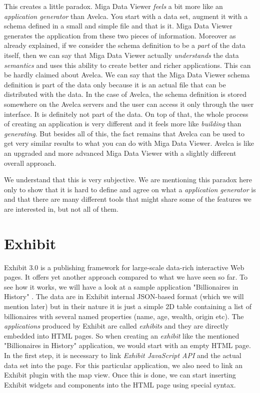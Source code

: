 This creates a little paradox. Miga Data Viewer \emph{feels} a bit more like an \emph{application generator} than Avelca. You start with a data set, augment it with a schema defined in a small and simple file and that is it. Miga Data Viewer generates the application from these two pieces of information. Moreover as already explained, if we consider the schema definition to be a \emph{part} of the data itself, then we can say that Miga Data Viewer actually \emph{understands} the data \emph{semantics} and uses this ability to create better and richer applications. This can be hardly claimed about Avelca. We can say that the Miga Data Viewer schema definition is part of the data only because it is an actual file that can be distributed with the data. In the case of Avelca, the schema definition is stored somewhere on the Avelca servers and the user can access it only through the user interface. It is definitely not part of the data. On top of that, the whole process of creating an application is very different and it feels more like \emph{building} than \emph{generating}. But besides all of this, the fact remains that Avelca can be used to get very similar results to what you can do with Miga Data Viewer. Avelca is like an upgraded and more advanced Miga Data Viewer with a slightly different overall approach.

We understand that this is very subjective. We are mentioning this paradox here only to show that it is hard to define and agree on what a \emph{application generator} is and that there are many different tools that might share some of the features we are interested in, but not all of them.

\section{Exhibit}

Exhibit 3.0 \cite{exhibit} is a publishing framework for large-scale data-rich interactive Web pages. It offers yet another approach compared to what we have seen so far. To see how it works, we will have a look at a sample application "Billionaires in History" \cite{exhibit_example}. The data are in Exhibit internal JSON-based format (which we will mention later) but in their nature it is just a simple 2D table containing a list of billionaires with several named properties (name, age, wealth, origin etc). The \emph{applications} produced by Exhibit are called \emph{exhibits} and they are directly embedded into HTML pages. So when creating an \emph{exhibit} like the mentioned "Billionaires in History" application, we would start with an empty HTML page. In the first step, it is necessary to link \emph{Exhibit JavaScript API} and the actual data set into the page. For this particular application, we also need to link an Exhibit plugin with the map view. Once this is done, we can start inserting Exhibit widgets and components into the HTML page using special syntax.

